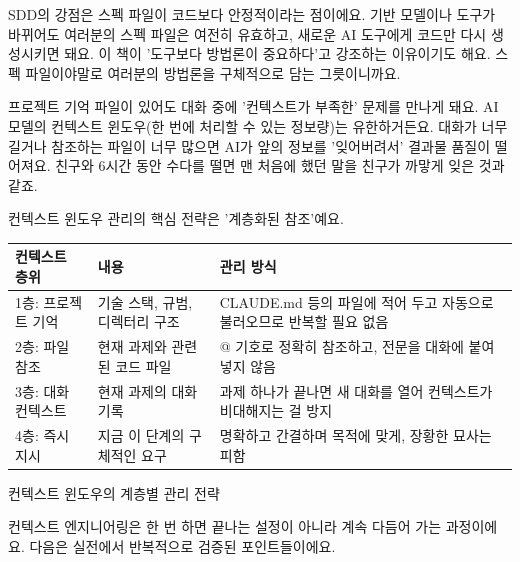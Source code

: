SDD의 강점은 스펙 파일이 코드보다 안정적이라는 점이에요. 기반 모델이나 도구가 바뀌어도 여러분의 스펙 파일은 여전히 유효하고, 새로운 AI 도구에게 코드만 다시 생성시키면 돼요. 이 책이 '도구보다 방법론이 중요하다'고 강조하는 이유이기도 해요. 스펙 파일이야말로 여러분의 방법론을 구체적으로 담는 그릇이니까요.


프로젝트 기억 파일이 있어도 대화 중에 '컨텍스트가 부족한' 문제를 만나게 돼요. AI 모델의 컨텍스트 윈도우(한 번에 처리할 수 있는 정보량)는 유한하거든요. 대화가 너무 길거나 참조하는 파일이 너무 많으면 AI가 앞의 정보를 '잊어버려서' 결과물 품질이 떨어져요. 친구와 6시간 동안 수다를 떨면 맨 처음에 했던 말을 친구가 까맣게 잊은 것과 같죠.

컨텍스트 윈도우 관리의 핵심 전략은 '계층화된 참조'예요.

\begin{center}
\begin{tabularx}{\linewidth}{|X|X|X|}
\hline
\textbf{컨텍스트 층위} & \textbf{내용} & \textbf{관리 방식} \tabularnewline
\hline
1층: 프로젝트 기억 & 기술 스택, 규범, 디렉터리 구조 & CLAUDE.md 등의 파일에 적어 두고 자동으로 불러오므로 반복할 필요 없음 \tabularnewline
2층: 파일 참조 & 현재 과제와 관련된 코드 파일 & @ 기호로 정확히 참조하고, 전문을 대화에 붙여 넣지 않음 \tabularnewline
3층: 대화 컨텍스트 & 현재 과제의 대화 기록 & 과제 하나가 끝나면 새 대화를 열어 컨텍스트가 비대해지는 걸 방지 \tabularnewline
4층: 즉시 지시 & 지금 이 단계의 구체적인 요구 & 명확하고 간결하며 목적에 맞게, 장황한 묘사는 피함 \tabularnewline
\hline
\end{tabularx}
\end{center}

\begin{center}\small\color{gray}컨텍스트 윈도우의 계층별 관리 전략\end{center}


컨텍스트 엔지니어링은 한 번 하면 끝나는 설정이 아니라 계속 다듬어 가는 과정이에요. 다음은 실전에서 반복적으로 검증된 포인트들이에요.

